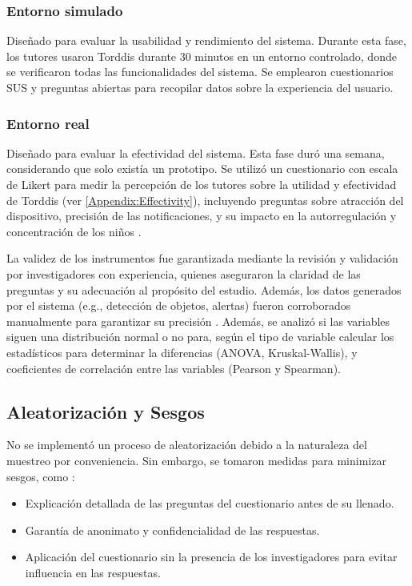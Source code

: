 \documentclass[a4paper,fleqn]{cas-sc}
\begin{document}
			\subsubsection{Entorno simulado}
				Diseñado para evaluar la usabilidad y rendimiento del sistema. Durante esta fase, los tutores usaron Torddis durante 30 minutos en un entorno controlado, donde se verificaron todas las funcionalidades del sistema. Se emplearon cuestionarios SUS y preguntas abiertas para recopilar datos sobre la experiencia del usuario.
			
			\subsubsection{Entorno real}
				Diseñado para evaluar la efectividad del sistema. Esta fase duró una semana, considerando que solo existía un prototipo. Se utilizó un cuestionario con escala de Likert para medir la percepción de los tutores sobre la utilidad y efectividad de Torddis (ver \ref{Appendix:Effectivity}), incluyendo preguntas sobre atracción del dispositivo, precisión de las notificaciones, y su impacto en la autorregulación y concentración de los niños \citep{Ackermans2025Young}.
			
				La validez de los instrumentos fue garantizada mediante la revisión y validación por investigadores con experiencia, quienes aseguraron la claridad de las preguntas y su adecuación al propósito del estudio. Además, los datos generados por el sistema (e.g., detección de objetos, alertas) fueron corroborados manualmente para garantizar su precisión \citep{Wang2025Development}. Además, se analizó si las variables siguen una distribución normal o no para, según el tipo de variable calcular los estadísticos para determinar la diferencias (ANOVA, Kruskal-Wallis), y coeficientes de correlación entre las variables (Pearson y Spearman).
		
		\subsection{Aleatorización y Sesgos}
			No se implementó un proceso de aleatorización debido a la naturaleza del muestreo por conveniencia. Sin embargo, se tomaron medidas para minimizar sesgos, como \citep{Huang2025How}:
			
			\begin{itemize}
				\item Explicación detallada de las preguntas del cuestionario antes de su llenado.
				\item Garantía de anonimato y confidencialidad de las respuestas.
				\item Aplicación del cuestionario sin la presencia de los investigadores para evitar influencia en las respuestas.
			\end{itemize}
		
\end{document}
